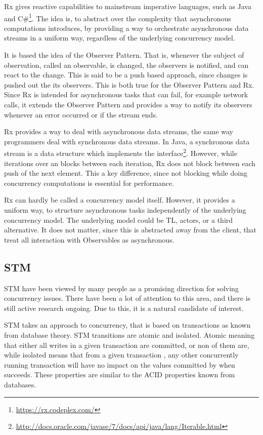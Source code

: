 \ac{Rx} gives reactive capabilities to mainstream imperative languages, such as Java and C\#\footnote{\url{https://rx.codeplex.com/}}. The idea is, to abstract over the complexity that asynchronous computations introduces, by providing a way to orchestrate asynchronous data streams in a uniform way, regardless of the underlying concurrency model.

It is based the idea of the Observer Pattern\cite{gamma1994design}. That is, whenever the subject of observation, called an observable, is changed, the observers is notified, and can react to the change. This is said to be a push based approach, since changes is pushed out the its observers. This is both true for the Observer Pattern and \ac{Rx}. Since \ac{Rx} is intended for asynchronous tasks that can fail, for example network calls, it extends the Observer Pattern and provides a way to notify its observers whenever an error occurred or if the stream ends.

\ac{Rx} provides a way to deal with asynchronous data streams, the same way programmers deal with synchronous data streams. In Java, a synchronous data stream is a data structure which implements the  interface\footnote{\url{http://docs.oracle.com/javase/7/docs/api/java/lang/Iterable.html}}. However, while iterations over an  blocks between each iteration, \ac{Rx} does not block between each push of the next element. This a key difference, since not blocking while doing concurrency computations is essential for performance.

\ac{Rx} can hardly be called a concurrency model itself. However, it provides a uniform way, to structure asynchronous tasks independently of the underlying concurrency model. The underlying model could be \ac{TL}, actors, or a third alternative. It does not matter, since this is abstracted away from the client, that treat all interaction with Observables as asynchronous.

\subsection{\acl{STM}}
\ac{STM} have been viewed by many people as a promising direction for solving concurrency issues\cite{sutter2005software}. There have been a lot of attention to this area, and there is still active research ongoing. Due to this, it is a natural candidate of interest.

\ac{STM} takes an approach to concurrency, that is based on transactions as known from database theory\cite[p. 1]{shavit1997software}. \ac{STM} transitions are atomic and isolated. Atomic meaning that either all writes in a given transaction are committed, or non of them are, while isolated means that from a given transaction , any other concurrently running transaction will have no impact on the values committed by  when  succeeds\cite[p. 102]{sevenModels}. These properties are similar to the \ac{ACID} properties known from databases\cite[p. 754]{elmasri2011fundamentals}.

